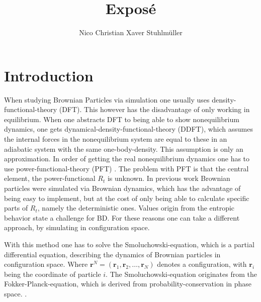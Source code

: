 \documentclass[a4paper]{article}
\author{Nico Christian Xaver Stuhlmüller}
\title{Expos\'e}
\renewcommand\vec[1]{\mathbf{#1}}
\begin{document}
\maketitle
\tableofcontents
\thispagestyle{empty}
\cleardoublepage

\section{Introduction}
\setcounter{page}{1}
When studying Brownian Particles via simulation one usually uses density-functional-theory (DFT). This however has the disadvantage of only working in equilibrium. When one abstracts DFT to being able to show nonequilibrium dynamics, one gets dynamical-density-functional-theory (DDFT), which assumes the internal forces in the nonequilibrium system are equal to these in an adiabatic system with the same one-body-density. This assumption is only an approximation. In order of getting the real nonequilibrium dynamics one has to use power-functional-theory (PFT) \cite{MS100}.
The problem with PFT is that the central element, the power-functional $ R_t $ is unknown. In previous work Brownian particles were simulated via Brownian dynamics, which has the advantage of being easy to implement, but at the cost of only being able to calculate specific parts of $ R_t $, namely the deterministic ones. Values origin from the entropic behavior state a challenge for BD. For these reasons one can take a different approach, by simulating in configuration space.

With this method one has to solve the Smoluchowski-equation, which is a partial differential equation, describing the dynamics of Brownian particles in configuration space. Where  $\vec{r}^N=\left( \vec{r}_1,\vec{r}_2, \dots,\vec{r}_N \right) $ denotes a configuration, with $\vec{r}_i$ being the coordinate of particle $i$. The Smoluchowski-equation originates from the Fokker-Planck-equation, which is derived from probability-conservation in phase space. \cite{Tobi}. 
\end{document}
